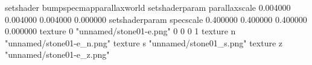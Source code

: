 setshader bumpspecmapparallaxworld
setshaderparam parallaxscale 0.004000 0.004000 0.004000 0.000000
setshaderparam specscale 0.400000 0.400000 0.400000 0.000000
texture 0 "unnamed/stone01-e.png" 0 0 0 1
texture n "unnamed/stone01-e_n.png"
texture s "unnamed/stone01_s.png"
texture z "unnamed/stone01-e_z.png"